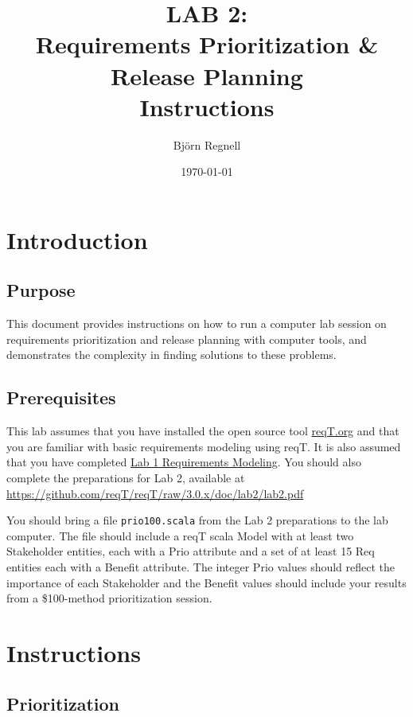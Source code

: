 \documentclass[11pt]{article}
\title{{\bf LAB 2:\\Requirements Prioritization \& Release Planning}\\ Instructions
}
\author{Björn Regnell}
\date{\today}
\begin{document}
\maketitle

\section{Introduction}

\subsection{Purpose} This document provides instructions on how to run 
a computer lab session on requirements prioritization and release planning with computer tools, and demonstrates the complexity in finding solutions to these problems.  

\subsection{Prerequisites} This lab assumes that you have installed the open source tool \href{http://reqT.org}{reqT.org} and that you are familiar with basic requirements modeling using reqT. It is also assumed that you have completed \href{https://github.com/reqT/reqT/raw/3.0.x/doc/lab1/lab1.pdf}{Lab 1 Requirements Modeling}. You should also complete the preparations for Lab 2, available at \url{https://github.com/reqT/reqT/raw/3.0.x/doc/lab2/lab2.pdf} 

You should bring a file \verb+prio100.scala+ from the Lab 2 preparations to the lab computer. The file should include a reqT scala Model with at least two Stakeholder entities, each with a Prio attribute and a set of at least 15 Req entities each with a Benefit attribute. The integer Prio values should reflect the importance of each Stakeholder and the Benefit values should include your results from a \$100-method prioritization session.  


\clearpage\newpage
\section{Instructions}\label{section:instr}

\subsection{Prioritization}
\end{document}
